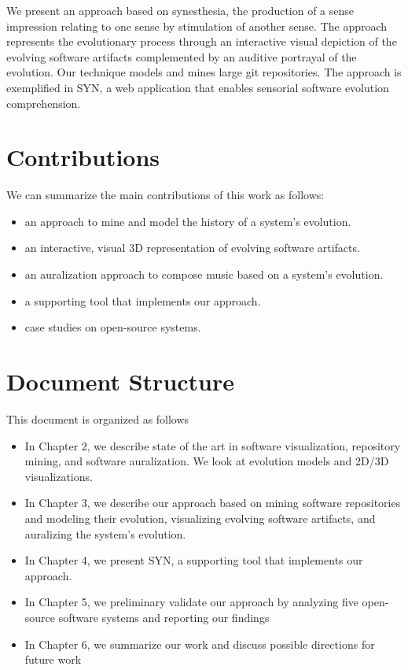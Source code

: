 We present an approach based on synesthesia, the production of a sense impression relating to one sense by stimulation of another sense. The approach represents the evolutionary process through an interactive visual depiction of the evolving software artifacts complemented by an auditive portrayal of the evolution. Our technique models and mines large git repositories.
The approach is exemplified in SYN, a web application that enables sensorial software evolution comprehension.
\newpage

\section{Contributions}
We can summarize the main contributions of this work as follows:
\begin{itemize}
 \item an approach to mine and model the history of a system's evolution.
 \item an interactive, visual 3D representation of evolving software artifacts.
 \item an auralization approach to compose music based on a system's evolution.
 \item a supporting tool that implements our approach.
 \item case studies on open-source systems.
\end{itemize}


\section{Document Structure}
This document is organized as follows
\begin{itemize}
 \item In Chapter 2, we describe state of the art in software visualization, repository mining, and software auralization. We look at evolution models and 2D/3D visualizations. 
 \item In Chapter 3, we describe our approach based on mining software repositories and modeling their evolution, visualizing evolving software artifacts, and auralizing the system's evolution. 
 \item In Chapter 4, we present SYN, a supporting tool that implements our approach. 
 \item In Chapter 5, we preliminary validate our approach by analyzing five open-source software systems and reporting our findings
 \item In Chapter 6, we summarize our work and discuss possible directions for future work \end{itemize}